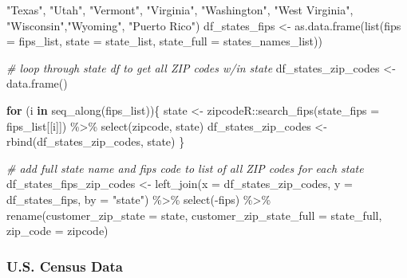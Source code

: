 \documentclass[
]{book}
\newenvironment{Shaded}{\begin{snugshade}}{\end{snugshade}}
\newcommand{\AttributeTok}[1]{\textcolor[rgb]{0.77,0.63,0.00}{#1}}
\newcommand{\CommentTok}[1]{\textcolor[rgb]{0.56,0.35,0.01}{\textit{#1}}}
\newcommand{\ControlFlowTok}[1]{\textcolor[rgb]{0.13,0.29,0.53}{\textbf{#1}}}
\newcommand{\FunctionTok}[1]{\textcolor[rgb]{0.00,0.00,0.00}{#1}}
\newcommand{\NormalTok}[1]{#1}
\newcommand{\OtherTok}[1]{\textcolor[rgb]{0.56,0.35,0.01}{#1}}
\newcommand{\SpecialCharTok}[1]{\textcolor[rgb]{0.00,0.00,0.00}{#1}}
\newcommand{\StringTok}[1]{\textcolor[rgb]{0.31,0.60,0.02}{#1}}
\begin{document}
\begin{Shaded}
\begin{Highlighting}[]
  \StringTok{"Texas"}\NormalTok{, }\StringTok{"Utah"}\NormalTok{, }\StringTok{"Vermont"}\NormalTok{, }\StringTok{"Virginia"}\NormalTok{, }\StringTok{"Washington"}\NormalTok{, }
  \StringTok{"West Virginia"}\NormalTok{, }\StringTok{"Wisconsin"}\NormalTok{,}\StringTok{"Wyoming"}\NormalTok{, }\StringTok{"Puerto Rico"}\NormalTok{)}
\NormalTok{df\_states\_fips }\OtherTok{\textless{}{-}} \FunctionTok{as.data.frame}\NormalTok{(}\FunctionTok{list}\NormalTok{(}\AttributeTok{fips =}\NormalTok{ fips\_list,}
                                     \AttributeTok{state =}\NormalTok{ state\_list,}
                                     \AttributeTok{state\_full =}\NormalTok{ states\_names\_list))}

\CommentTok{\# loop through state df to get all ZIP codes w/in state}
\NormalTok{df\_states\_zip\_codes }\OtherTok{\textless{}{-}} \FunctionTok{data.frame}\NormalTok{()}

\ControlFlowTok{for}\NormalTok{ (i }\ControlFlowTok{in} \FunctionTok{seq\_along}\NormalTok{(fips\_list))\{}
\NormalTok{  state }\OtherTok{\textless{}{-}}\NormalTok{ zipcodeR}\SpecialCharTok{::}\FunctionTok{search\_fips}\NormalTok{(}\AttributeTok{state\_fips =}\NormalTok{ fips\_list[[i]]) }\SpecialCharTok{\%\textgreater{}\%} 
    \FunctionTok{select}\NormalTok{(zipcode, state)}
\NormalTok{  df\_states\_zip\_codes }\OtherTok{\textless{}{-}} \FunctionTok{rbind}\NormalTok{(df\_states\_zip\_codes, state)}
\NormalTok{\}}

\CommentTok{\# add full state name and fips code to list of all ZIP codes for each state}
\NormalTok{df\_states\_fips\_zip\_codes }\OtherTok{\textless{}{-}} 
  \FunctionTok{left\_join}\NormalTok{(}\AttributeTok{x =}\NormalTok{ df\_states\_zip\_codes,}
            \AttributeTok{y =}\NormalTok{ df\_states\_fips,}
            \AttributeTok{by =} \StringTok{"state"}\NormalTok{) }\SpecialCharTok{\%\textgreater{}\%} 
  \FunctionTok{select}\NormalTok{(}\SpecialCharTok{{-}}\NormalTok{fips) }\SpecialCharTok{\%\textgreater{}\%} 
  \FunctionTok{rename}\NormalTok{(}\AttributeTok{customer\_zip\_state =}\NormalTok{ state,}
         \AttributeTok{customer\_zip\_state\_full =}\NormalTok{ state\_full,}
         \AttributeTok{zip\_code =}\NormalTok{ zipcode)}
\end{Highlighting}
\end{Shaded}

\hypertarget{u.s.-census-data}{%
\subsubsection{U.S. Census Data}\label{u.s.-census-data}}
\end{document}
